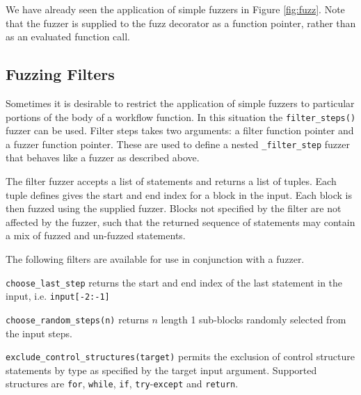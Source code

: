 \documentclass{sig-alternate}
\newenvironment{FunctionList}{%
\lstset{basicstyle=\ttfamily\bfseries\small}
\begin{list}{}{\leftmargin=5pt}
}{\end{list}\lstset{basicstyle=\ttfamily\small}}
\begin{document}
We have already seen the application of simple fuzzers in Figure \ref{fig:fuzz}.
Note that the fuzzer is supplied to the fuzz decorator as a function pointer,
rather than as an evaluated function call.


\subsection{Fuzzing Filters}


Sometimes it is desirable to restrict the application of simple fuzzers to
particular portions of the body of a workflow function.  In this situation the
\lstinline!filter_steps()! fuzzer can be used.  Filter steps takes two
arguments: a filter function pointer and a fuzzer function pointer.  These are
used to define a nested \lstinline!_filter_step! fuzzer that behaves like a
fuzzer as described above.

The filter fuzzer accepts a list of statements and returns a list of tuples.
Each tuple defines gives the start and end index for a block in the input.  Each
block is then fuzzed using the supplied fuzzer.  Blocks not specified by the
filter are not affected by the fuzzer, such that the returned sequence of
statements may contain a mix of fuzzed and un-fuzzed statements.

The following filters are available for use in conjunction with a fuzzer.

\begin{FunctionList}

\item \lstinline!choose_last_step! returns the start and end index of the last
  statement in the input, i.e. \lstinline!input[-2:-1]!

\item \lstinline!choose_random_steps(n)!  returns $n$ length 1 sub-blocks
  randomly selected from the input steps.

\item \lstinline!exclude_control_structures(target)! permits the exclusion of
  control structure statements by type as specified by the target input
  argument. Supported structures are \lstinline!for!, \lstinline!while!,
  \lstinline!if!, \lstinline!try!-\lstinline!except! and \lstinline!return!.

\end{FunctionList}
\end{document}
